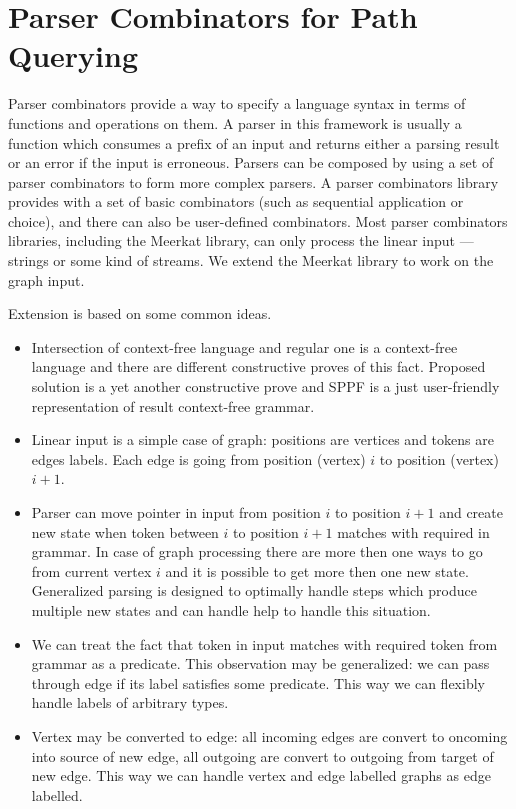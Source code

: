 \section{Parser Combinators for Path Querying}
\label{sec:combinators}

Parser combinators provide a way to specify a language syntax in terms of functions and operations on them. 
A parser in this framework is usually a function which consumes a prefix of an input and returns either a parsing result or an error if the input is erroneous. 
Parsers can be composed by using a set of parser combinators to form more complex parsers. 
A parser combinators library provides with a set of basic combinators (such as sequential application or choice), and there can also be user-defined combinators. 
Most parser combinators libraries, including the Meerkat library, can only process the linear input --- strings or some kind of streams. 
We extend the Meerkat library to work on the graph input.

Extension is based on some common ideas.
\begin{itemize}
\item Intersection of context-free language and regular one is a context-free language and there are different constructive proves of this fact.
Proposed solution is a yet another constructive prove and SPPF is a just user-friendly representation of result context-free grammar.
\item Linear input is a simple case of graph: positions are vertices and tokens are edges labels.
Each edge is going from position (vertex) $i$ to position (vertex) $i+1$.
\item Parser can move pointer in input from position $i$ to position $i+1$ and create new state when token between $i$ to position $i+1$ matches with required in grammar.
In case of graph processing there are more then one ways to go from current vertex $i$ and it is possible to get more then one new state.
Generalized parsing is designed to optimally handle steps which produce multiple new states and can handle help to handle this situation.
\item We can treat the fact that token in input matches with required token from grammar as a predicate.
This observation may be generalized: we can pass through  edge if its label satisfies some predicate.
This way we can flexibly handle labels of arbitrary types.
\item Vertex may be converted to edge: all incoming edges are convert to oncoming into source of new edge, all outgoing are convert to outgoing from target of new edge.
This way we can handle vertex and edge labelled graphs as edge labelled.
\end{itemize}

